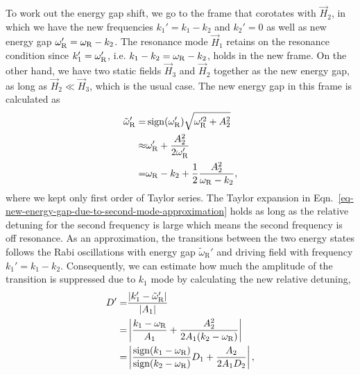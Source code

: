 To work out the energy gap shift, we go to the frame that corotates with $\vec H_2$, in which we have the new frequencies $k_1'=k_1-k_2$ and $k_2'=0$ as well as new energy gap $\omega_{\mathrm R}' = \omega_{\mathrm R}- k_2$. The resonance mode $\vec H_1$ retains on the resonance condition since $k_1'=\omega_{\mathrm R}'$, i.e. $k_1-k_2 = \omega_{\mathrm R}-k_2$, holds in the new frame. On the other hand, we have two static fields $\vec H_3$ and $\vec H_2$ together as the new energy gap, as long as $\vec H_2\ll \vec H_3$, which is the usual case. The new energy gap in this frame is calculated as
\begin{align}
    \tilde\omega_{\mathrm{R}}' =& \sign (\omega_{\mathrm R}') \sqrt{\omega_{\mathrm{R}}'^2 + A_2^2 } \nonumber\\
    \approx & \omega_{\mathrm{R}}' + \frac{A_2^2}{2\omega_{\mathrm R}'} \nonumber\\
    =& \omega_{\mathrm R} - k_2 + \frac{1}{2}\frac{A_2^2}{\omega_{\mathrm R} - k_2},
    \label{eq-new-energy-gap-due-to-second-mode-approximation}
\end{align}
where we kept only first order of Taylor series. The Taylor expansion in Eqn.~\ref{eq-new-energy-gap-due-to-second-mode-approximation} holds as long as the relative detuning for the second frequency is large which means the second frequency is off resonance. As an approximation, the transitions between the two energy states follows the Rabi oscillations with energy gap $\tilde \omega_{\mathrm R}'$ and driving field with frequency $k_1'=k_1-k_2$. Consequently, we can estimate how much the amplitude of the transition is suppressed due to $k_1$ mode by calculating the new relative detuning,
\begin{align}
    \RD' =& \frac{\lvert k_1' - \tilde \omega_{\mathrm R}' \rvert}{\lvert A_1 \rvert}\nonumber\\
    =& \left \lvert \frac{ k_1-\omega_{\mathrm R}}{ A_1} + \frac{ A_2^2 }{2  A_1 ( k_2 - \omega_{\mathrm R})} \right  \rvert\\
    =& \left \lvert  \frac{\sign({ k_1-\omega_{\mathrm R}})}{\sign (k_2 - \omega_{\mathrm R})} \RD_1 +  \frac{ A_2 }{2 A_1 \RD_2 }\right \rvert ,
    \label{eq-relative-detuning-changed}
\end{align}
